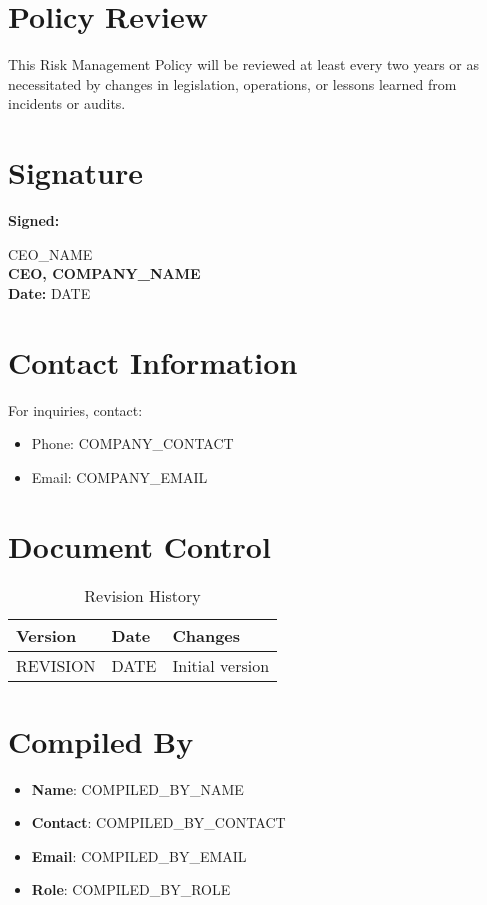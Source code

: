 \documentclass[12pt]{article}
\begin{document}
\section{Policy Review}
This Risk Management Policy will be reviewed at least every two years or as necessitated by changes in legislation, operations, or lessons learned from incidents or audits.

\section{Signature}
\textbf{Signed:}

{{CEO_NAME}}\\
\textbf{CEO, {{COMPANY_NAME}}}\\
\textbf{Date:} {{DATE}}

\section{Contact Information}
For inquiries, contact:
\begin{itemize}
    \item Phone: {{COMPANY_CONTACT}}
    \item Email: {{COMPANY_EMAIL}}
\end{itemize}

\section{Document Control}
\begin{table}[h]
    \centering
    \begin{tabular}{p{3cm}p{3cm}p{6cm}}
        \toprule
        \textbf{Version} & \textbf{Date} & \textbf{Changes} \\
        \midrule
        {{REVISION}} & {{DATE}} & Initial version \\
        \bottomrule
    \end{tabular}
    \caption{Revision History}
\end{table}

\section{Compiled By}
\begin{itemize}
    \item \textbf{Name}: {{COMPILED_BY_NAME}}
    \item \textbf{Contact}: {{COMPILED_BY_CONTACT}}
    \item \textbf{Email}: {{COMPILED_BY_EMAIL}}
    \item \textbf{Role}: {{COMPILED_BY_ROLE}}
\end{itemize}
\end{document}
